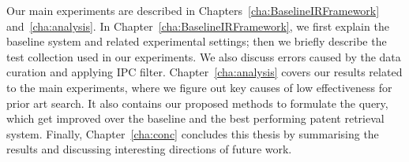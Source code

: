 Our main experiments are described in Chapters~\ref{cha:BaselineIRFramework} and~\ref{cha:analysis}. 
In Chapter~\ref{cha:BaselineIRFramework}, we first explain the baseline system and related experimental settings; 
then we briefly describe the test collection used in our experiments. We also discuss errors caused by the data curation and applying IPC filter.
Chapter~\ref{cha:analysis} covers our results related to the main experiments, where we figure out 
key causes of low effectiveness for prior art search. It also contains our proposed methods to formulate the query, which get improved over the baseline and the best performing patent retrieval system. 
Finally, Chapter~\ref{cha:conc} concludes this thesis by 
summarising the results and discussing interesting directions of future work.


